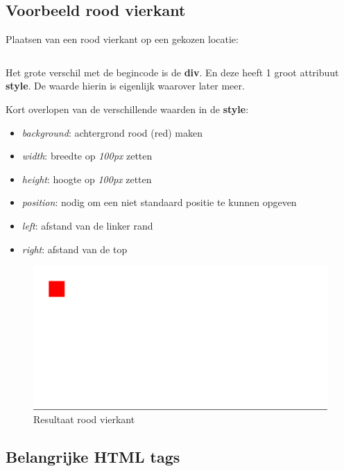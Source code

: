 \subsection{Voorbeeld rood vierkant}%
\label{sub:voorbeeld_rood_vierkant}

Plaatsen van een rood vierkant op een gekozen locatie:
\inputminted{html}{../cheatsheet/pos_div.html}

Het grote verschil met de begincode is de \textbf{div}. En deze heeft 1 groot attribuut \textbf{style}. De waarde hierin is eigenlijk \CSS waarover later meer.

Kort overlopen van de verschillende waarden in de \textbf{style}:
\begin{itemize}
    \item \emph{background}: achtergrond rood (red) maken
    \item \emph{width}: breedte op \emph{100px} zetten
    \item \emph{height}: hoogte op \emph{100px} zetten
    \item \emph{position}: nodig om een niet standaard positie te kunnen opgeven
    \item \emph{left}: afstand van de linker rand
    \item \emph{right}: afstand van de top
\end{itemize}

\begin{figure}[htpb]
    \centering
    \includegraphics[width=0.6\linewidth]{figures/resultaat_rood_vierkant.png}
    \caption{Resultaat rood vierkant}
    \label{fig:resultaat_rood_vierkant}
\end{figure}

\subsection{Belangrijke HTML tags}%
\label{sub:belangrijke_html_tags}


